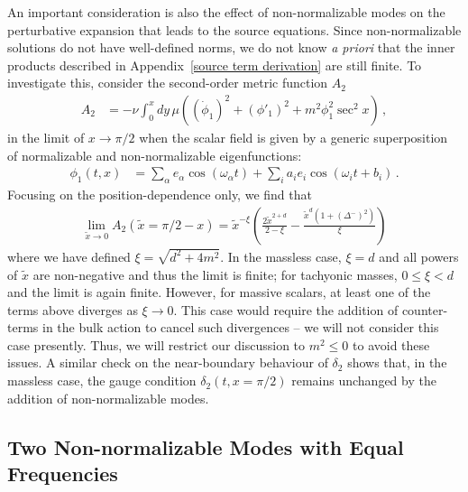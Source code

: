 \documentclass[letterpaper,11pt]{article}
\begin{document}
An important consideration is also the effect of non-normalizable modes on the perturbative expansion that leads to the source equations. Since non-normalizable solutions do not have well-defined norms, we do not know \emph{a priori} that the inner products described in Appendix~\ref{source term derivation} are still finite. To investigate this, consider the second-order metric function $A_2$
\begin{align}
A_2 &= - \nu \int^x_0 dy \, \mu \left( (\dot \phi_1)^2 + (\phi'_1)^2 + m^2 \phi_1^2 \sec^2 x \right) \, ,
\end{align}
in the limit of $x \to \pi/2$ when the scalar field is given by a generic superposition of normalizable and non-normalizable eigenfunctions:
\begin{align}
\phi_1 (t, x) &= \sum_\alpha e_\alpha \cos (\omega_\alpha t ) + \sum_i a_i e_i \cos (\omega_i t + b_i) \, .
\end{align}
Focusing on the position-dependence only, we find that
\begin{align}
\lim_{\tilde x \to 0} A_2 (\tilde x = \pi /2 - x) = \tilde{x}^{-\xi} \left( \frac{2 \tilde{x}^{2+d}}{2 - \xi} - \frac{\tilde{x}^d (1 + \left(\Delta^{-}\right)^2)}{\xi} \right)
\end{align}
where we have defined $\xi = \sqrt{d^2 + 4m^2}$. In the massless case, $\xi = d$ and all powers of $\tilde{x}$ are non-negative and thus the limit is finite; for tachyonic masses, $0 \leq \xi < d$ and the limit is again finite. However, for massive scalars, at least one of the terms above diverges as $\xi \to 0$. This case would require the addition of counter-terms in the bulk action to cancel such divergences -- we will not consider this case presently. Thus, we will restrict our discussion to $m^2 \leq 0$ to avoid these issues. A similar check on the near-boundary behaviour of $\delta_2$ shows that, in the massless case, the gauge condition $\delta_2 (t, x=\pi/2)$ remains unchanged by the addition of non-normalizable modes.

\subsection{Two Non-normalizable Modes with Equal Frequencies}
\end{document}
